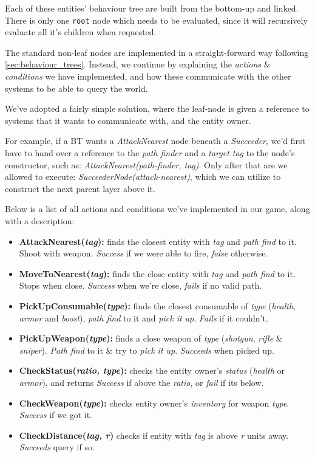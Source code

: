 \documentclass[a4paper, twocolumn]{article}
\begin{document}
        Each of these entities' behaviour tree are built from the bottom-up and linked. There is only one \texttt{root} node which needs to be evaluated, since it will recursively evaluate all it's children when requested.

        The standard non-leaf nodes are implemented in a straight-forward way following \cref{sec:behaviour_trees}. Instead, we continue by explaining the \emph{actions} \& \emph{conditions} we have implemented, and how these communicate with the other systems to be able to query the world.

        We've adopted a fairly simple solution, where the leaf-node is given a reference to systems that it wants to communicate with, and the entity owner.

        For example, if a BT wants a \emph{AttackNearest} node beneath a \emph{Succeeder}, we'd first have to hand over a reference to the \emph{path finder} and a \emph{target tag} to the node's constructor, such as: \emph{AttackNearest(path-finder, tag)}. Only after that are we allowed to execute: \emph{SucceederNode(attack-nearest)}, which we can utilize to construct the next parent layer above it.

        Below is a list of all actions and conditions we've implemented in our game, along with a description:

        \begin{itemize}
            \item{\textbf{AttackNearest(\emph{tag}):} finds the closest entity with \emph{tag} and \emph{path find} to it. Shoot with weapon. \emph{Success} if we were able to fire, \emph{false} otherwise.}
            \item{\textbf{MoveToNearest(\emph{tag}):} finds the close entity with \emph{tag} and \emph{path find} to it. Stops when close. \emph{Success} when we're close, \emph{fails} if no valid path.}
            \item{\textbf{PickUpConsumable(\emph{type}):} finds the closest consumable of \emph{type} (\emph{health}, \emph{armor} and \emph{boost}), \emph{path find} to it and \emph{pick it up}. \emph{Fails} if it couldn't.}
            \item{\textbf{PickUpWeapon(\emph{type}):} finds a close weapon of \emph{type} (\emph{shotgun}, \emph{rifle} \& \emph{sniper}). \emph{Path find} to it \& try to \emph{pick it up}. \emph{Succeeds} when picked up.}
        \end{itemize}
        \begin{itemize}
            \item{\textbf{CheckStatus(\emph{ratio, type}):} checks the entity owner's \emph{status} (\emph{health} or \emph{armor}), and returns \emph{Success} if above the \emph{ratio}, or \emph{fail} if its below.}
            \item{\textbf{CheckWeapon(\emph{type}):} checks entity owner's \emph{inventory} for weapon \emph{type}. \emph{Success} if we got it.}
            \item{\textbf{CheckDistance(\emph{tag, r})} checks if entity with \emph{tag} is above \emph{r} units away. \emph{Succeeds} query if so.}
        \end{itemize}
\end{document}
